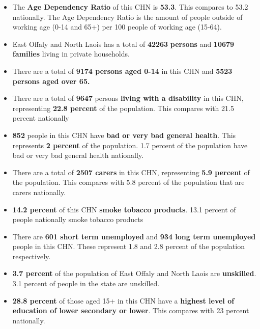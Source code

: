 \documentclass{article}
\begin{document}
\begin{itemize}

\item The \textbf{Age Dependency Ratio} of this CHN is  \textbf{53.3}. This compares to 53.2 nationally. The Age Dependency Ratio is the amount of people outside of working age (0-14 and 65+) per 100 people of working age (15-64). 

\item East Offaly and North Laois has a total of \textbf{\num{42263}} \textbf{persons} and  \textbf{\num{10679}} \textbf{families} living in private households.

\item There are a total of \textbf{\num{9174} persons aged 0-14} in this CHN and \textbf{\num{5523} persons aged over 65.} 

\item There are a total of \textbf{\num{9647}} persons \textbf{living with a disability} in this CHN, representing \textbf{22.8 percent} of the population. This compares with  21.5 percent nationally

\item \textbf{\num{852}} people in this CHN have \textbf{bad or very bad general health}. This represents \textbf{2 percent} of the population. 1.7 percent of the population have bad or very bad general health nationally. 

\item There are a total of \textbf{\num{2507} carers} in this CHN, representing \textbf{5.9 percent} of the population. This compares with 5.8 percent of the population that are carers nationally. 

\item \textbf{14.2 percent} of this CHN \textbf{smoke tobacco products}. 13.1 percent of people nationally smoke tobacco products

\item There are \textbf{\num{601} short term unemployed} and \textbf{\num{934} long term unemployed} people in this CHN. These represent 1.8 and 2.8 percent of the population respectively.

\item  \textbf{3.7 percent} of the population of East Offaly and North Laois are \textbf{unskilled}. 3.1 percent of people in the state are unskilled.

\item \textbf{28.8 percent} of those aged 15+ in this CHN have a \textbf{highest level of education of lower secondary or lower}. This compares with 23 percent nationally. 


\end{itemize}
\end{document}
